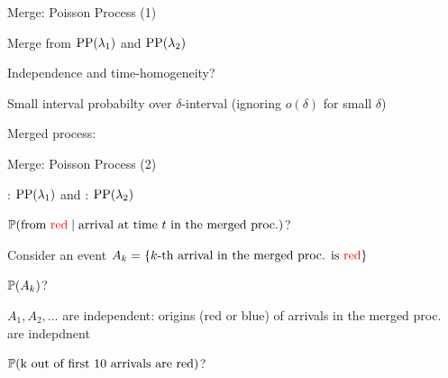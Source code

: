 \begin{frame}{Merge: Poisson Process (1)}

\plitemsep 0.1in
\bci

\item Merge from $\text{PP}(\lambda_1)$ and $\text{PP}(\lambda_2)$

\item<2-> Independence and time-homogeneity? 

\item<3-> Small interval probabilty over $\delta$-interval (ignoring
  $o(\delta)$ for small $\delta$)

\item<4-> Merged process: 
\eci
\end{frame}

\begin{frame}{Merge: Poisson Process (2)}

\plitemsep 0.1in
\bci

\item {}: $\text{PP}(\lambda_1)$ and : $\text{PP}(\lambda_2)$

\item<2-> $\mathbb{P}( \text{from {\color{red} red}} \mid \text{arrival at time $t$ in the merged
      proc.} )$?  
  
\item<4-> Consider an event $A_k = \{\text{$k$-th arrival in the merged
    proc. is {\color{red} red}} \}$
  \bci
 \item<5->   $\mathbb{P}( A_k )$? 
\item<7-> $A_1, A_2, \ldots$ are independent: origins (red or blue) of arrivals in the
  merged proc. are indepdnent

  \eci

\item<8-> $\mathbb{P}( \text{k out of first 10 arrivals are red} )$?
  
  \eci
\end{frame}

